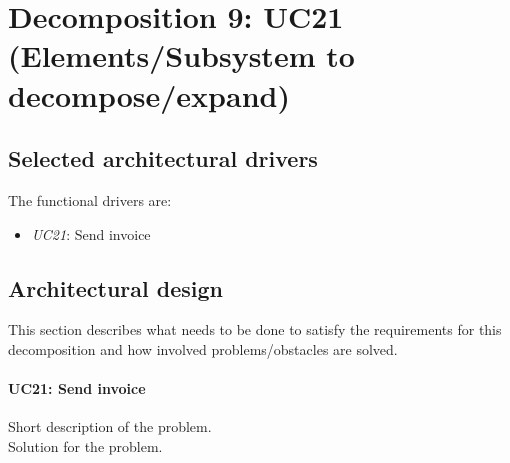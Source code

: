 \section{Decomposition 9: UC21 (Elements/Subsystem to decompose/expand)}


\subsection{Selected architectural drivers}
    The functional drivers are:
    \begin{itemize}
        \item \emph{UC21}: Send invoice \\
    \end{itemize}


\subsection{Architectural design}
    This section describes what needs to be done to satisfy the requirements for
    this decomposition and how involved problems/obstacles are solved.

    \paragraph{UC21: Send invoice}
        Short description of the problem.\\
        Solution for the problem.


